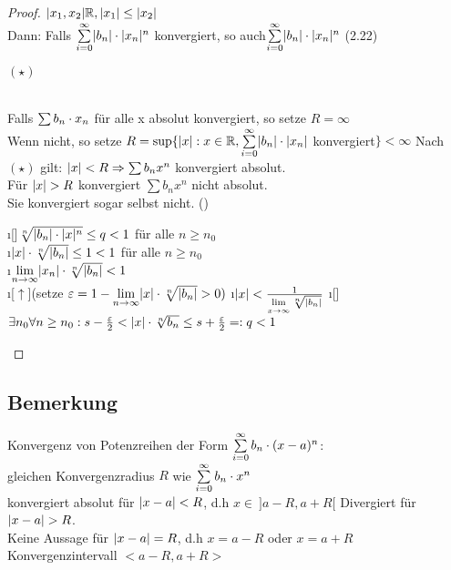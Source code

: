 \begin{proof}
$\lvert x_1,x_2 \rvert \mathbb{R}, \lvert x_1 \rvert \leq \lvert x_2 \rvert$\\
Dann: Falls $\sum\limits_{i=0}^{\infty} \lvert b_n \rvert \cdot \lvert x_n \rvert^n$ konvergiert, so auch$ \sum\limits_{i=0}^{\infty} \lvert b_n \rvert \cdot \lvert x_n \rvert^n$ (2.22) \begin{huge}
$(\star)$
\end{huge}\\
Falls $\sum b_n \cdot x_n$ für alle x absolut konvergiert, so setze $R= \infty$\\
Wenn nicht, so setze $R = \sup \{\lvert x \rvert:x\in \mathbb{R}, \sum\limits_{i=0}^{\infty} \lvert b_n \rvert\cdot \lvert x_n \rvert $ konvergiert$ \} < \infty$
Nach $(\star)$ gilt: $\lvert x \rvert < R \Rightarrow \sum b_nx^n$ konvergiert absolut.\\
Für $\lvert x \rvert > R$ konvergiert $\sum b_nx^n$ nicht absolut.\\
Sie konvergiert sogar selbst nicht. (\cite{2})\\
\begin{enumerate}[$\Leftrightarrow$]
\i[]$\sqrt[n]{\lvert b_n \rvert \cdot \lvert x \rvert^n} \leq q < 1 $ für alle $n \geq n_0$\\
\i $\lvert x \rvert \cdot \sqrt[n]{\lvert b_n \rvert} \leq 1 < 1$ für alle $n \geq n_0$\\
\i $\lim\limits_{n \rightarrow \infty} \lvert x_n \rvert \cdot \sqrt[n]{\lvert b_n \rvert} < 1$\\
\i[$\uparrow$](setze $\varepsilon = 1 - \lim\limits_{n \rightarrow \infty} \lvert x \rvert \cdot \sqrt[n]{\lvert b_n \rvert} > 0)$
\i $\lvert x \rvert < \frac{1}{\lim\limits_{x \rightarrow \infty} \sqrt[n]{\lvert b_n \rvert}}$
\i[] $\exists n_0 \forall n \geq n_0 : s - \frac{\varepsilon}{2} < \lvert x \rvert \cdot \sqrt[n]{b_n} \leq s + \frac{\varepsilon}{2} =: q < 1$
\end{enumerate}

 
\end{proof}
\subsection{Bemerkung}
Konvergenz von Potenzreihen der Form $\sum\limits_{i=0}^{\infty} b_n \cdot (x-a)^n$:\\
gleichen Konvergenzradius $R$ wie $\sum\limits_{i=0}^{\infty} b_n \cdot x^n$\\
konvergiert absolut für $\lvert x-a \rvert < R$, d.h $x \in \ ]a-R,  a+R[$
Divergiert für $\lvert x-a \rvert > R$.\\
Keine Aussage für $\lvert x-a \rvert = R$, d.h $ x = a-R$ oder $x = a+R$\\
Konvergenzintervall $<a-R,a+R>$
